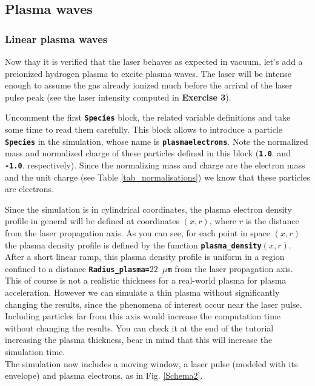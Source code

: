 \documentclass[a4paper,12pt]{extarticle}
\newcommand{\commandline}[1]{\texttt{\textbf{#1}}}
\begin{document}
\subsection{Plasma waves}

\subsubsection{Linear plasma waves}
Now thay it is verified that the laser behaves as expected in vacuum, let's add a preionized hydrogen plasma to excite plasma waves.
The laser will be intense enough to assume the gas already ionized much before the arrival of the laser pulse peak (see the laser intensity computed in \textbf{Exercise 3}).

Uncomment the first \commandline{Species} block, the related variable definitions and take some time to read them carefully. This block allows to introduce a particle \commandline{Species} in the simulation, whose name is \commandline{plasmaelectrons}. Note the normalized mass and normalized charge of these particles defined in this block (\commandline{1.0}. and \commandline{-1.0}. respectively). Since the normalizing mass and charge are the electron mass and the unit charge (see Table \ref{tab_normalisations}) we know that these particles are electrons.

Since the simulation is in cylindrical coordinates, the plasma electron density profile in general will be defined at coordinates $(x,r)$, where $r$ is the distance from the laser propagation axis. As you can see, for each point in space $(x,r)$ the plasma density profile is defined by the function \commandline{plasma\_density$(x,r)$}. After a short linear ramp, this plasma density profile is uniform in a region confined to a distance \commandline{Radius\_plasma=$22$ $\mu$m} from the laser propagation axis. This of course is not a realistic thickness for a real-world plasma for plasma acceleration. However we can simulate a thin plasma without significantly changing the results, since the phenomena of interest occur near the laser pulse. Including particles far from this axis would increase the computation time without changing the results. You can check it at the end of the tutorial increasing the plasma thickness, bear in mind that this will increase the  simulation time.\\

The simulation now includes a moving window, a laser pulse (modeled with its envelope) and plasma electrons, as in Fig. \ref{Schema2}.
\end{document}
